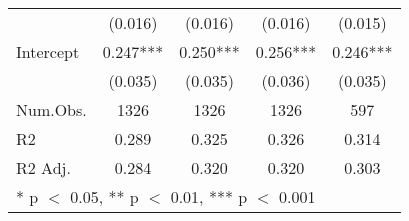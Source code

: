 \begin{table}
\begin{tabular}[t]{lcccc}
 & (0.016) & (0.016) & (0.016) & (0.015)\\
Intercept & 0.247*** & 0.250*** & 0.256*** & 0.246***\\
 & (0.035) & (0.035) & (0.036) & (0.035)\\
\midrule
Num.Obs. & 1326 & 1326 & 1326 & 597\\
R2 & 0.289 & 0.325 & 0.326 & 0.314\\
R2 Adj. & 0.284 & 0.320 & 0.320 & 0.303\\
\bottomrule
\multicolumn{5}{l}{\rule{0pt}{1em}* p $<$ 0.05, ** p $<$ 0.01, *** p $<$ 0.001}\\
\end{tabular}
\end{table}
